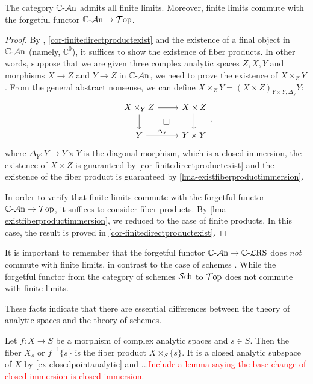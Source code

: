 \begin{corollary}
    The category $\mathbb{C}\text{-}\mathcal{A}\mathrm{n}$ admits all finite limits. Moreover, finite limits commute with the forgetful functor $\mathbb{C}\text{-}\mathcal{A}\mathrm{n}\rightarrow \mathcal{T}\mathrm{op}$.
\end{corollary}
\begin{proof}
    By \cite[\href{https://stacks.math.columbia.edu/tag/002O}{Tag 002O}]{stacks-project}, \cref{cor-finitedirectproductexist} and the existence of a final object in $\mathbb{C}\text{-}\mathcal{A}\mathrm{n}$ (namely, $\mathbb{C}^0$), it suffices to show the existence of fiber products. In other words, suppose that we are given three complex analytic spaces $Z,X,Y$ and morphisms $X\rightarrow Z$ and $Y\rightarrow Z$ in $\mathbb{C}\text{-}\mathcal{A}\mathrm{n}$, we need to prove the existence of $X\times_Z Y$. From the general abstract nonsense, we can define $X\times_Z Y=(X\times Z)_{Y\times Y,\Delta_Y}Y$:
    \[ 
    \begin{tikzcd}
        & X\times_Y Z \arrow[r]\arrow[d]\arrow[rd,"\square",phantom] & X\times Z \arrow[d]\\
        & Y  \arrow[r,"\Delta_Y"] & Y\times Y
    \end{tikzcd},
    \]
    where $\Delta_Y:Y\rightarrow Y\times Y$ is the diagonal morphism, which is a closed immersion, the existence of $X\times Z$ is guaranteed by \cref{cor-finitedirectproductexist} and the existence of the fiber product is guaranteed by \cref{lma-existfiberproductimmersion}.

    In order to verify that finite limits commute with the forgetful functor $\mathbb{C}\text{-}\mathcal{A}\mathrm{n}\rightarrow \mathcal{T}\mathrm{op}$, it suffices to consider fiber products. By \cref{lma-existfiberproductimmersion}, we reduced to the case of finite products. In this case, the result is proved in \cref{cor-finitedirectproductexist}.
\end{proof}
\begin{remark}
    It is important to remember that the forgetful functor $\mathbb{C}\text{-}\mathcal{A}\mathrm{n}\rightarrow \mathbb{C}\text{-}\mathcal{L}\mathrm{RS}$ does \emph{not} commute with finite limits, in contrast to the case of schemes \cite[\href{https://stacks.math.columbia.edu/tag/01JN}{Tag 01JN}]{stacks-project}. While the forgetful functor from the category of schemes $\mathcal{S}\mathrm{ch}$ to $\mathcal{T}\mathrm{op}$ does not commute with finite limits.
    
    These facts indicate that there are essential differences between the theory of analytic spaces and the theory of schemes.
\end{remark}

\begin{definition}
    Let $f:X\rightarrow S$ be a morphism of complex analytic spaces and $s\in S$. Then the fiber $X_s$ or $f^{-1}\{s\}$ is the fiber product $X\times_{S}\{s\}$. It is a closed analytic subspace of $X$ by \cref{ex-closedpointanalytic} and ...\textcolor{red}{Include a lemma saying the base change of closed immersion is closed immersion}.
\end{definition}

